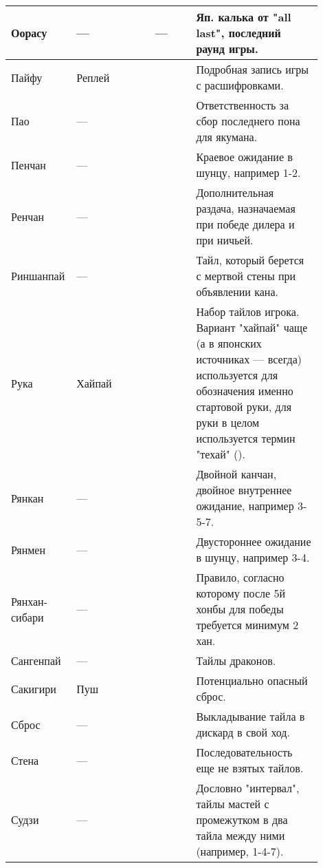 \begin{tabularx}{\linewidth}{L{0.14\linewidth}L{0.13\linewidth}L{0.1\linewidth}L{0.13\linewidth}L{0.4\linewidth}}
	\midrule
	Оорасу & --- &  & --- & Яп. калька от "all last", последний раунд игры. \\
	\midrule
	Пайфу & Реплей &  &  & Подробная запись игры с расшифровками. \\
	\midrule
	Пао & --- &  &  & Ответственность за сбор последнего пона для якумана. \\
	\midrule
	Пенчан & --- &  &  & Краевое ожидание в шунцу, например 1-2. \\
	\midrule
	Ренчан & --- &  &  & Дополнительная раздача, назначаемая при победе дилера и при ничьей. \\
	\midrule
	Риншанпай & --- &  &   & Тайл, который берется с мертвой стены при объявлении кана. \\
	\midrule
	Рука & Хайпай &  &  & Набор тайлов игрока. Вариант "хайпай" чаще (а в японских источниках --- всегда) используется для обозначения именно стартовой руки, для руки в целом используется термин "техай" (). \\
	\midrule
	Рянкан & --- &  &  & Двойной канчан, двойное внутреннее ожидание, например 3-5-7. \\
	\midrule
	Рянмен & --- &  &  & Двустороннее ожидание в шунцу, например 3-4. \\
	\midrule
	Рянхан-сибари & --- &  &   & Правило, согласно которому после 5й хонбы для победы требуется минимум 2 хан. \\
	\midrule
	Сангенпай & --- &  &  & Тайлы драконов. \\
	\midrule
	Сакигири & Пуш &  &  & Потенциально опасный сброс. \\ 
	\midrule
	Сброс & --- &  &  & Выкладывание тайла в дискард в свой ход. \\ 
	\midrule
	Стена & --- &  &  & Последовательность еще не взятых тайлов. \\
	\midrule
	Судзи & --- &  &  & Дословно "интервал", тайлы мастей с промежутком в два тайла между ними (например, 1-4-7). \\

\end{tabularx}
